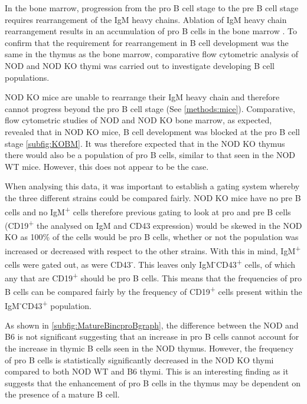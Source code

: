 In the bone marrow, progression from the pro B cell stage to the pre B cell stage requires rearrangement of the IgM heavy chains.
Ablation of IgM heavy chain rearrangement results in an accumulation of pro B cells in the bone marrow \toref{}.
To confirm that the requirement for rearrangement in B cell development was the same in the thymus as the bone marrow, comparative flow cytometric analysis of NOD and NOD KO thymi was carried out to investigate developing B cell populations.

NOD KO mice are unable to rearrange their IgM heavy chain and therefore cannot progress beyond the pro B cell stage (See \cref{methods:mice}). 
Comparative, flow cytometric studies of NOD and NOD KO bone marrow, as expected, revealed that in NOD KO mice, B cell development was blocked at the pro B cell stage \cref{subfig:KOBM}.
It was therefore expected that in the NOD KO thymus there would also be a population of pro B cells, similar to that seen in the NOD WT mice. 
However, this does not appear to be the case.

When analysing this data, it was important to establish a gating system whereby the three different strains could be compared fairly.
NOD KO mice have no pre B cells and no IgM\textsuperscript{+} cells therefore previous gating to look at pro and pre B cells (CD19\textsuperscript{+} the analysed on IgM and CD43 expression) would be skewed in the NOD KO as 100\% of the cells would be pro B cells, whether or not the population was increased or decreased with respect to the other strains.
With this in mind, IgM\textsuperscript{+} cells were gated out, as were CD43\textsuperscript{-}.
This leaves only IgM\textsuperscript{-}CD43\textsuperscript{+} cells, of which any that are CD19\textsuperscript{+} should be pro B cells.
This means that the frequencies of pro B cells can be compared fairly by the frequency of CD19\textsuperscript{+} cells present within the IgM\textsuperscript{-}CD43\textsuperscript{+} population.

As shown in \cref{subfig:MatureBincproBgraph}, the difference between the NOD and B6 is not significant suggesting that an increase in pro B cells cannot account for the increase in thymic B cells seen in the NOD thymus.
However, the frequency of pro B cells is statistically significantly decreased in the NOD KO thymi compared to both NOD WT and B6 thymi.
This is an interesting finding as it suggests that the enhancement of pro B cells in the thymus may be dependent on the presence of a mature B cell.


